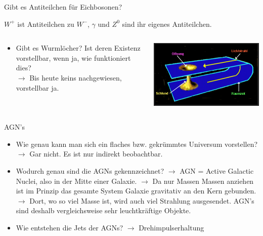 \begin{frame}{Gibt es Antiteilchen für Eichbosonen?}

$W^+$ ist Antiteilchen zu $W^-$, $\gamma$ und $Z^0$ sind ihr eigenes Antiteilchen.

\vspace{0.5cm}

\begin{columns}[T, onlytextwidth]
  \begin{column}{0.47\textwidth}
    \begin{itemize}
      \setlength\itemsep{2em}
      \item Gibt es Wurmlöcher? Ist deren Existenz vorstellbar, wenn ja, wie funktioniert dies? \\
      $\longrightarrow$ Bis heute keins nachgewiesen, vorstellbar ja.
    \end{itemize}
  \end{column}
  \hfill
  \begin{column}{0.47\textwidth}
    \includegraphics[width=\textwidth]{images/Frage2.png}
  \end{column}
\end{columns}


\end{frame}

\begin{frame}{AGN's}
\begin{itemize}
  \setlength\itemsep{2em}
  \item Wie genau kann man sich ein flaches bzw. gekrümmtes Universum vorstellen?
  $\longrightarrow$ Gar nicht. Es ist nur indirekt beobachtbar.
  \item Wodurch genau sind die AGNs gekennzeichnet?
  $\longrightarrow$ AGN = Active Galactic Nuclei, also in der Mitte einer Galaxie.
  $\longrightarrow$ Da nur Massen Massen anziehen ist im Prinzip das gesamte
  System Galaxie gravitativ an den Kern gebunden.
  $\longrightarrow$ Dort, wo so viel Masse ist, wird auch viel Strahlung
  ausgesendet. AGN's sind deshalb vergleichsweise sehr leuchtkräftige Objekte.
  \item Wie entstehen die Jets der AGNs?
  $\longrightarrow$ Drehimpulserhaltung
\end{itemize}
\end{frame}

